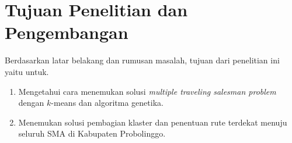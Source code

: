 \section{Tujuan Penelitian dan Pengembangan}

Berdasarkan latar belakang dan rumusan masalah, tujuan dari penelitian ini yaitu untuk.
\begin{enumerate}
	\item Mengetahui cara menemukan solusi \textit{multiple traveling salesman problem} dengan $k$-means dan algoritma genetika.
	\item Menemukan solusi pembagian klaster dan penentuan rute terdekat menuju seluruh SMA di Kabupaten Probolinggo.
\end{enumerate}
